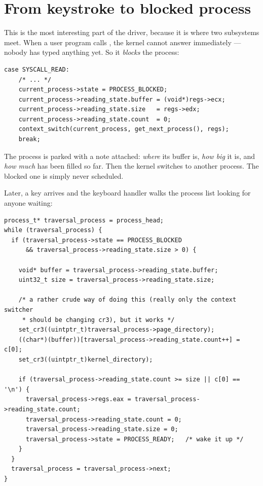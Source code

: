 \section{From keystroke to blocked process}

This is the most interesting part of the driver, because it is where two subsystems meet. When a
user program calls , the kernel cannot answer immediately --- nobody has
typed anything yet. So it \emph{blocks} the process:

\begin{lstlisting}[style=c]
case SYSCALL_READ:
    /* ... */
    current_process->state = PROCESS_BLOCKED;
    current_process->reading_state.buffer = (void*)regs->ecx;
    current_process->reading_state.size   = regs->edx;
    current_process->reading_state.count  = 0;
    context_switch(current_process, get_next_process(), regs);
    break;
\end{lstlisting}

The process is parked with a note attached: \emph{where} its buffer is, \emph{how big} it is, and
\emph{how much} has been filled so far. Then the kernel switches to another process. The blocked one
is simply never scheduled.

Later, a key arrives and the keyboard handler walks the process list looking for anyone waiting:

\begin{lstlisting}[style=c]
process_t* traversal_process = process_head;
while (traversal_process) {
  if (traversal_process->state == PROCESS_BLOCKED
      && traversal_process->reading_state.size > 0) {

    void* buffer = traversal_process->reading_state.buffer;
    uint32_t size = traversal_process->reading_state.size;

    /* a rather crude way of doing this (really only the context switcher
     * should be changing cr3), but it works */
    set_cr3((uintptr_t)traversal_process->page_directory);
    ((char*)(buffer))[traversal_process->reading_state.count++] = c[0];
    set_cr3((uintptr_t)kernel_directory);

    if (traversal_process->reading_state.count >= size || c[0] == '\n') {
      traversal_process->regs.eax = traversal_process->reading_state.count;
      traversal_process->reading_state.count = 0;
      traversal_process->reading_state.size = 0;
      traversal_process->state = PROCESS_READY;   /* wake it up */
    }
  }
  traversal_process = traversal_process->next;
}
\end{lstlisting}

